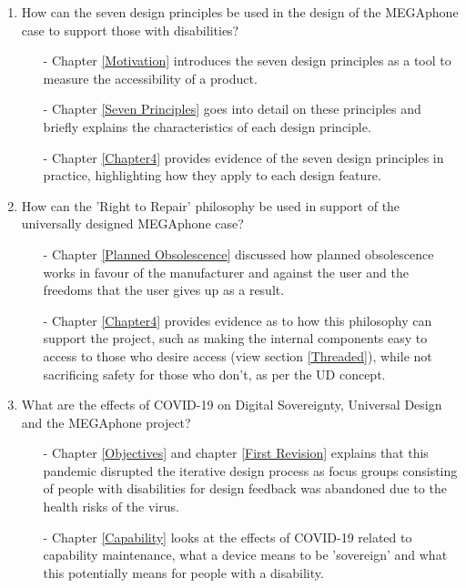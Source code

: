 \begin{enumerate}
    \item How can the seven design principles be used in the design of the MEGAphone case to support those with disabilities?
        \begin{enumerate}
        \item[-] Chapter \ref{Motivation} introduces the seven design principles as a tool to measure the accessibility of a product.
        \item[-] Chapter \ref{Seven Principles} goes into detail on these principles and briefly explains the characteristics of each design principle.
        \item[-] Chapter \ref{Chapter4} provides evidence of the seven design principles in practice, highlighting how they apply to each design feature.
        \end{enumerate} 
    \item How can the 'Right to Repair' philosophy be used in support of the universally designed MEGAphone case?
        \begin{enumerate}
        \item[-] Chapter \ref{Planned Obsolescence} discussed how planned obsolescence works in favour of the manufacturer and against the user and the freedoms that the user gives up as a result.
        \item[-] Chapter \ref{Chapter4} provides evidence as to how this philosophy can support the project, such as making the internal components easy to access to those who desire access (view section \ref{Threaded}), while not sacrificing safety for those who don't, as per the UD concept.
        \end{enumerate} 
    \item What are the effects of COVID-19 on Digital Sovereignty, Universal Design and the MEGAphone project?
        \begin{enumerate}
        \item[-] Chapter \ref{Objectives} and chapter \ref{First Revision} explains that this pandemic disrupted the iterative design process as focus groups consisting of people with disabilities for design feedback was abandoned due to the health risks of the virus.
        \item[-] Chapter \ref{Capability} looks at the effects of COVID-19 related to capability maintenance, what a device means to be 'sovereign' and what this potentially means for people with a disability.
        \end{enumerate} 
\end{enumerate}

